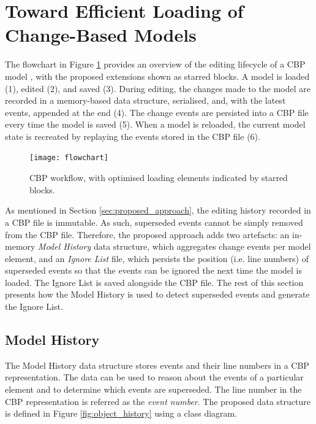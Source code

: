 \section{Toward Efficient Loading of Change-Based Models}
\label{sec:loading_time_optimisation}

The flowchart in Figure \ref{fig:flowchart} provides an overview of the editing lifecycle of a CBP model \cite{DBLP:conf/models/YohannisKP17}, with the proposed extensions shown as starred blocks. A model is loaded (1), edited (2), and saved (3). During editing, the changes made to the model are recorded in a memory-based data structure, serialised, and, with the latest events, appended at the end (4). The change events are persisted into a CBP file every time the model is saved (5). When a model is reloaded, the current model state is recreated by replaying the events stored in the CBP file (6).

\begin{figure}[ht]
  \centering
  \texttt{[image: flowchart]}
  \caption{CBP workflow, with optimised loading elements indicated by starred blocks.}
  \label{fig:flowchart}
\end{figure}

As mentioned in Section \ref{sec:proposed_approach}, the editing history recorded in a CBP file is immutable. As such, superseded events cannot be simply removed from the CBP file. Therefore, the proposed approach adds two artefacts: an in-memory \textit{Model History} data structure, which aggregates change events per model element, and an \textit{Ignore List} file, which persists the position (i.e. line numbers) of superseded events so that the events can be ignored the next time the model is loaded. The Ignore List is saved alongside the CBP file. The rest of this section presents how the Model History is used to detect superseded events and generate the Ignore List.

\subsection{Model History}
\label{subsec:model_history}
The Model History data structure stores events and their line numbers in a CBP representation. The data can be used to reason about the events of a particular element and to determine which events are superseded. The line number in the CBP representation is referred as the \textit{event number}. The proposed data structure is defined in Figure \ref{fig:object_history} using a class diagram.


